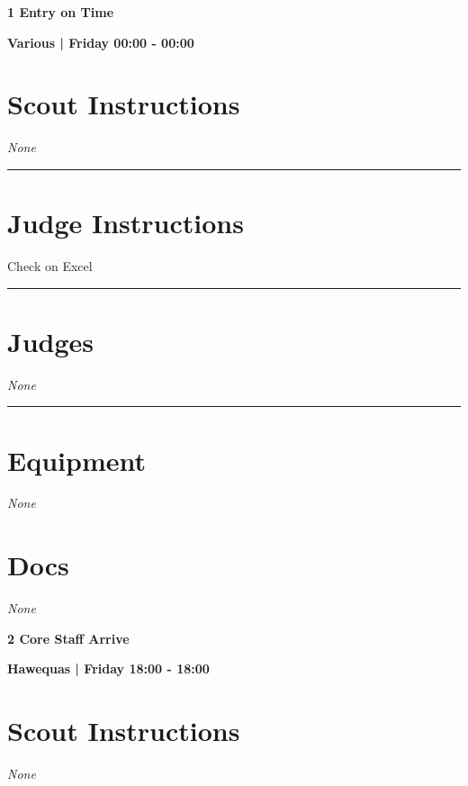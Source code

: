 \documentclass[10pt]{article}
\newcommand{\newtitle}[1]{\begin{center}{\Huge\bfseries #1 }\\ \vspace{5mm}\end{center}}
\newcommand{\newsubtitle}[1]{\begin{center}{\color{grey}\Large\bfseries #1 }\\ \vspace{5mm}\end{center}}
\begin{document}
	



		\newtitle{1 Entry on Time }
	\newsubtitle{Various | Friday 00:00 - 00:00}
		\setcounter{section}{0}
	\section*{Scout Instructions}
		\textit{None}
	
	\vspace{0.5cm}
	\hrule
	\vspace{0.5cm}

		\section*{Judge Instructions}
		Check on Excel
\vspace{0.5cm}
	\hrule
	\vspace{0.5cm}
		\section*{\faUsers \: Judges}

					\textit{None}
			\vspace{0.5cm}
	\hrule
	\vspace{0.5cm}

	\begin{multicols}{2}

		\section*{\faWrench \: Equipment}

				\textit{None}
		
		\vfill\null
		\columnbreak

			\section*{\faFile \: Docs}
		 	\textit{None}
	

		\vfill\null

		\end{multicols}



	\vspace{1cm}


	\clearpage
		\newtitle{2 Core Staff Arrive }
	\newsubtitle{Hawequas | Friday 18:00 - 18:00}
		\setcounter{section}{1}
	\section*{Scout Instructions}
		\textit{None}
	
\end{document}
